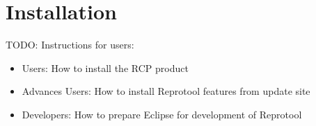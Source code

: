 \section{Installation}

TODO: Instructions for users:
\begin{itemize}
	\item Users: How to install the RCP product
	\item Advances Users: How to install Reprotool features from update site
	\item Developers: How to prepare Eclipse for development of Reprotool
\end{itemize}
